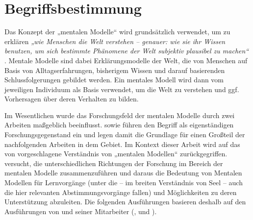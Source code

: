
\section{Begriffsbestimmung} %
\label{sec:begriffsbestimmung}


Das Konzept der „mentalen Modelle“ wird grundsätzlich verwendet, um zu erklären \emph{„wie Menschen die Welt verstehen -- genauer: wie sie ihr Wissen benutzen, um sich bestimmte Phänomene der Welt subjektiv plausibel zu machen“} \citep[][S. VII]{Seel91}. Mentale Modelle sind dabei Erklärungsmodelle der Welt, die von Menschen auf Basis von Alltagserfahrungen, bisherigem Wissen und darauf basierenden Schlussfolgerungen gebildet werden. Ein mentales Modell wird dann vom jeweiligen Individuum als Basis verwendet, um die Welt zu verstehen und ggf. Vorhersagen über deren Verhalten zu bilden. \citep[][S. VII]{Seel91}

Im Wesentlichen wurde das Forschungsfeld der mentalen Modelle durch zwei Arbeiten maßgeblich beeinflusst. \citet{Johnson-Laird81} sowie \citet{Kleer81} führen den Begriff als eigenständigen Forschungsgegenstand ein und legen damit die Grundlage für einen Großteil der nachfolgenden Arbeiten in dem Gebiet. Im Kontext dieser Arbeit wird auf das von \citet{Seel91} vorgeschlagene Verständnis von „mentalen Modellen“ zurückgegriffen. \citet{Seel91} versucht, die unterschiedlichen Richtungen der Forschung im Bereich der mentalen Modelle zusammenzuführen und daraus die Bedeutung von Mentalen Modellen für Lernvorgänge (unter die -- im breiten Verständnis von Seel -- auch die hier relevanten Abstimmungsvorgänge fallen) und Möglichkeiten zu deren Unterstützung abzuleiten. Die folgenden Ausführungen basieren deshalb auf den Ausführungen von \citeauthor{Seel91} und seiner Mitarbeiter (\citet{Ifenthaler06}, \citet{Pirnay-Dummer06} und \citet{Hanke06}).

